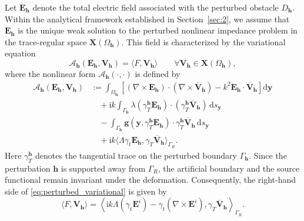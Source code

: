 \documentclass[12pt,reqno]{amsart}
\theoremstyle{definition}
\numberwithin{equation}{section}
\begin{document}
Let $\mathbf{E}_{\mathbf{h}}$ denote the total electric field associated with the perturbed obstacle $D_{\mathbf{h}}$. Within the analytical framework established in Section~\ref{sec:2}, we assume that $\mathbf{E}_{\mathbf{h}}$ is the unique weak solution to the perturbed nonlinear impedance problem in the trace-regular space $\mathbf{X}(\Omega_{\mathbf{h}})$. This field is characterized by the variational equation
\begin{equation}\label{eq:perturbed_variational}
\mathcal{A}_{\mathbf{h}}(\mathbf{E}_{\mathbf{h}}, \mathbf{V}_{\mathbf{h}}) = \langle F, \mathbf{V}_{\mathbf{h}} \rangle \qquad \forall \mathbf{V}_{\mathbf{h}} \in \mathbf{X}(\Omega_{\mathbf{h}}),
\end{equation}
where the nonlinear form $\mathcal{A}_{\mathbf{h}}(\cdot, \cdot)$ is defined by
\begin{equation}\label{eq:perturbed_var_form}
\begin{aligned}
\mathcal{A}_{\mathbf{h}}(\mathbf{E}_{\mathbf{h}}, \mathbf{V}_{\mathbf{h}}) &:= \int_{\Omega_{\mathbf{h}}} \left[ (\nabla \times \mathbf{E}_{\mathbf{h}}) \cdot (\nabla \times \overline{\mathbf{V}}_{\mathbf{h}}) - k^2 \mathbf{E}_{\mathbf{h}} \cdot \overline{\mathbf{V}}_{\mathbf{h}} \right] \mathrm{d}\boldsymbol{y} \\
&\quad + \mathrm{i}k \int_{\Gamma_{\mathbf{h}}} \lambda (\gamma_T^{\mathbf{h}} \mathbf{E}_{\mathbf{h}}) \cdot (\gamma_T^{\mathbf{h}} \overline{\mathbf{V}}_{\mathbf{h}}) \,\mathrm{d}s_{\boldsymbol{y}} \\
&\quad - \int_{\Gamma_{\mathbf{h}}} \mathbf{g}(\boldsymbol{y}, \gamma_T^{\mathbf{h}} \mathbf{E}_{\mathbf{h}}) \cdot \gamma_T^{\mathbf{h}} \overline{\mathbf{V}}_{\mathbf{h}} \,\mathrm{d}s_{\boldsymbol{y}} \\
&\quad + \mathrm{i}k \langle \Lambda \gamma_t \mathbf{E}_{\mathbf{h}}, \gamma_T \overline{\mathbf{V}}_{\mathbf{h}} \rangle_{\Gamma_R}.
\end{aligned}
\end{equation}
Here $\gamma_T^{\mathbf{h}}$ denotes the tangential trace on the perturbed boundary $\Gamma_{\mathbf{h}}$.
Since the perturbation $\mathbf{h}$ is supported away from $\Gamma_R$, the artificial boundary and the source functional remain invariant under the deformation. Consequently, the right-hand side of \eqref{eq:perturbed_variational} is given by
\begin{equation}\label{eq:F_perturbed}
\langle F, \mathbf{V}_{\mathbf{h}} \rangle = \left\langle \mathrm{i}k \Lambda (\gamma_t \mathbf{E}^i) - \gamma_t (\nabla \times \mathbf{E}^i), \gamma_T \overline{\mathbf{V}}_{\mathbf{h}} \right\rangle_{\Gamma_R}.
\end{equation}
\end{document}

